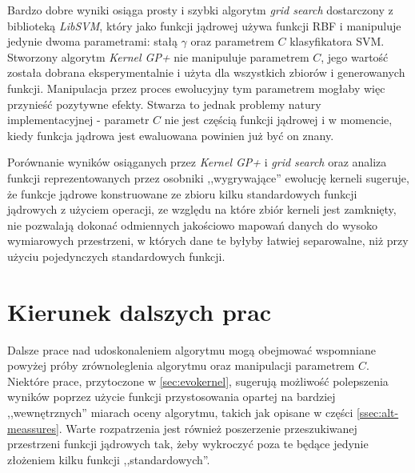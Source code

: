 Bardzo dobre wyniki osiąga prosty i szybki algorytm \emph{grid search} dostarczony z biblioteką \emph{LibSVM}, który jako funkcji jądrowej używa funkcji RBF i manipuluje jedynie dwoma parametrami: stałą $ \gamma $ oraz parametrem $ C $ klasyfikatora SVM. Stworzony algorytm \emph{Kernel GP+} nie manipuluje parametrem $ C $, jego wartość została dobrana eksperymentalnie i użyta dla wszystkich zbiorów i generowanych funkcji. Manipulacja przez proces ewolucyjny tym parametrem mogłaby więc przynieść pozytywne efekty. Stwarza to jednak problemy natury implementacyjnej - parametr $ C $ nie jest częścią funkcji jądrowej i w momencie, kiedy funkcja jądrowa jest ewaluowana powinien już być on znany.

Porównanie wyników osiąganych przez \emph{Kernel GP+} i \emph{grid search} oraz analiza funkcji reprezentowanych przez osobniki ,,wygrywające'' ewolucję kerneli sugeruje, że funkcje jądrowe konstruowane ze zbioru kilku standardowych funkcji jądrowych z użyciem operacji, ze względu na które zbiór kerneli jest zamknięty, nie pozwalają dokonać odmiennych jakościowo mapowań danych do wysoko wymiarowych przestrzeni, w których dane te byłyby łatwiej separowalne, niż przy użyciu pojedynczych standardowych funkcji.

\section{Kierunek dalszych prac}
Dalsze prace nad udoskonaleniem algorytmu mogą obejmować wspomniane powyżej próby zrównoleglenia algorytmu oraz manipulacji parametrem $ C $. Niektóre prace, przytoczone w \ref{sec:evokernel}, sugerują możliwość polepszenia wyników poprzez użycie funkcji przystosowania opartej na bardziej ,,wewnętrznych'' miarach oceny algorytmu, takich jak opisane w części \ref{ssec:alt-meassures}. Warte rozpatrzenia jest również poszerzenie przeszukiwanej przestrzeni funkcji jądrowych tak, żeby wykroczyć poza te będące jedynie złożeniem kilku funkcji ,,standardowych''.